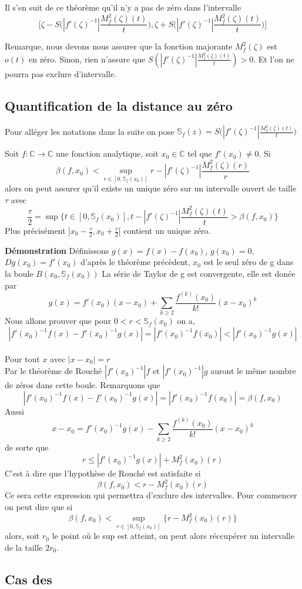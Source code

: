 \documentclass[a4paper,10.5pt]{article}
\begin{document}
	\noindent Il s'en suit de ce théorème qu'il n'y a pas de zéro dans l'intervalle \[\Big[\zeta-S\Big(|f'(\zeta)^{-1}|\frac{M_{f}^{2}(\zeta)(t)}{t}\Big),\zeta+S\Big(|f'(\zeta)^{-1}|\frac{M_{f}^{2}(\zeta)(t)}{t}\Big)\Big]\]
	
	\noindent Remarque, nous devons nous assurer que la fonction majorante $M_{f}^{2}(\zeta)$ est $o(t)$ en zéro. Sinon, rien n'assure que $S(|f'(\zeta)^{-1}|\frac{M_{f}^{2}(\zeta)(t)}{t})>0$. Et l'on ne pourra pas exclure d'intervalle.
	
	
	\subsection{Quantification de la distance au zéro}
	Pour alléger les notations dans la suite on pose $\mathbb{S}_{f}(z)=S\Big(|f'(\zeta)^{-1}|\frac{M_{f}^{2}(\zeta)(t)}{t}\Big)$
	
	\begin{theorem} Soit $f:\mathbb{C} \rightarrow \mathbb{C}$ une fonction analytique, soit $x_0 \in \mathbb{C}$ tel que $f'(x_0) \neq 0$. Si 
	\[\beta(f,x_0)<\sup_{r \in [0,\mathbb{S}_{f}(x_0)]} r-|f'(\zeta)^{-1}|\frac{M_{f}^{2}(\zeta)(r)}{r}\]
	 alors on peut assurer qu'il existe un unique zéro sur un intervalle ouvert de taille $\tau$ avec
	 \[\frac{\tau}{2}=\sup \Big\{t \in [0,\mathbb{S}_{f}(x_0)],  t-|f'(\zeta)^{-1}|\frac{M_{f}^{2}(\zeta)(t)}{t}>\beta(f,x_0)\Big\} \]
	 Plus précisément $]x_0-\frac{\tau}{2},x_0+\frac{\tau}{2}[$ contient un unique zéro.
	 
		

	\end{theorem}
	
	\noindent\textbf{Démonstration} Définissons $g(x)=f(x)-f(x_0)$, $g(x_0)=0$, $Dg(x_0)=f'(x_0)$ d'après le théorème précèdent, $x_0$ est le seul zéro de g dans la boule
	$B(x_0,\mathbb{S}_{f}(x_0))$
	La série de Taylor de g est convergente, elle est donée par
	\[g(x)=f'(x_0)(x-x_0)+ \sum_{k \geq 2}\frac{f^{(k)}(x_0)}{k!}(x-x_0)^k\]
	Nous allons prouver que pour $0<r<\mathbb{S}_{f}(x_0)$ on a,
	\[|f'(x_0)^{-1}f(x)-f'(x_0)^{-1}g(x)|=|f'(x_0)^{-1}f(x_0)|<|f'(x_0)^{-1}g(x)|\]
	\\
	Pour tout $x$ avec $|x-x_0|=r$
	\\
	Par le théorème de Rouché $|f'(x_0)^{-1}|f$ et $|f'(x_0)^{-1}|g$ auront le même nombre de zéros dans cette boule. Remarquons que 
	\[|f'(x_0)^{-1}f(x)-f'(x_0)^{-1}g(x)|=|f'(x_0)^{-1}f(x_0)|=\beta(f,x_0)\]
	Aussi
	\[x-x_0=f'(x_0)^{-1}g(x)-\sum_{k \geq 2}\frac{f^{(k)}(x_0)}{k!}(x-x_0)^k\]
	de sorte que
	\[r \leq |f'(x_0)^{-1}g(x)|+M_{f}^{2}(x_0)(r) \]
	C'est à dire que l'hypothèse de Rouché est satisfaite si
	\[\beta(f,x_0)<r-M_{f}^{2}(x_0)(r)\] 
	Ce sera cette expression qui permettra d'exclure des intervalles. Pour commencer on peut dire que si 
	\[\beta(f,x_0)< \sup_{r \in [0,\mathbb{S}_{f}(x_0)]}\{r-M_{f}^{2}(x_0)(r)\}\]
	alors, soit $r_0$ le point où le sup est atteint, on peut alors réccupérer un intervalle de la taille $2r_0$.
	
	
	\subsection{Cas des }

	
\end{document}

